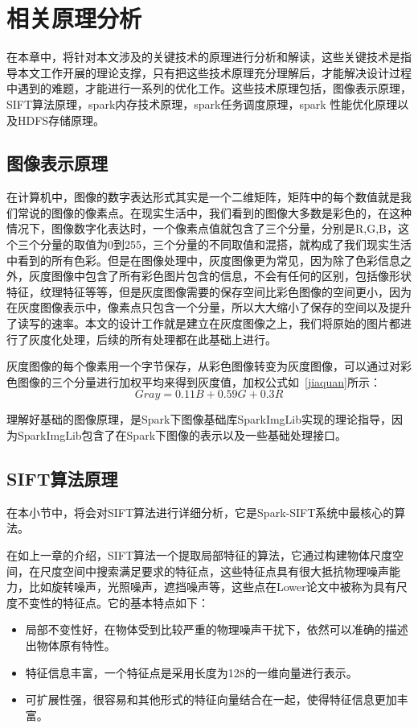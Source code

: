 ﻿\chapter{相关原理分析}
\label{xiangguanyuanli}
在本章中，将针对本文涉及的关键技术的原理进行分析和解读，这些关键技术是指导本文工作开展的理论支撑，只有把这些技术原理充分理解后，才能解决设计过程中遇到的难题，才能进行一系列的优化工作。这些技术原理包括，图像表示原理，SIFT算法原理，spark内存技术原理，spark任务调度原理，spark 性能优化原理以及HDFS存储原理。
\section{图像表示原理}
在计算机中，图像的数字表达形式其实是一个二维矩阵，矩阵中的每个数值就是我们常说的图像的像素点。在现实生活中，我们看到的图像大多数是彩色的，在这种情况下，图像数字化表达时，一个像素点值就包含了三个分量，分别是R,G,B，这个三个分量的取值为0到255，三个分量的不同取值和混搭，就构成了我们现实生活中看到的所有色彩。但是在图像处理中，灰度图像更为常见，因为除了色彩信息之外，灰度图像中包含了所有彩色图片包含的信息，不会有任何的区别，包括像形状特征，纹理特征等等，但是灰度图像需要的保存空间比彩色图像的空间更小，因为在灰度图像表示中，像素点只包含一个分量，所以大大缩小了保存的空间以及提升了读写的速率。本文的设计工作就是建立在灰度图像之上，我们将原始的图片都进行了灰度化处理，后续的所有处理都在此基础上进行。

灰度图像的每个像素用一个字节保存，从彩色图像转变为灰度图像，可以通过对彩色图像的三个分量进行加权平均来得到灰度值，加权公式如~\ref{jiaquan}所示：
\begin{equation}\label{jiaquan}
 Gray = 0.11B + 0.59G + 0.3R
\end{equation}

理解好基础的图像原理，是Spark下图像基础库SparkImgLib实现的理论指导，因为SparkImgLib包含了在Spark下图像的表示以及一些基础处理接口。
\section{SIFT算法原理}
\label{sec:sift}
在本小节中，将会对SIFT算法进行详细分析，它是Spark-SIFT系统中最核心的算法。

在如上一章的介绍，SIFT算法一个提取局部特征的算法，它通过构建物体尺度空间，在尺度空间中搜索满足要求的特征点，这些特征点具有很大抵抗物理噪声能力，比如旋转噪声，光照噪声，遮挡噪声等，这些点在Lower论文中被称为具有尺度不变性的特征点。它的基本特点如下：
\begin{itemize}
\item 局部不变性好，在物体受到比较严重的物理噪声干扰下，依然可以准确的描述出物体原有特性。
\item 特征信息丰富，一个特征点是采用长度为128的一维向量进行表示。
\item 可扩展性强，很容易和其他形式的特征向量结合在一起，使得特征信息更加丰富。
\end{itemize}

